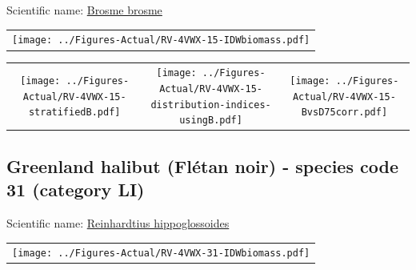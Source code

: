 \documentclass[12pt]{article}\usepackage[]{graphicx}\usepackage[]{color}
\begin{document}

Scientific name: \href{http://www.marinespecies.org/aphia.php?p=taxdetails\&id=126447}{Brosme brosme} \newline
\begin{minipage}{1.0\textwidth}
 \begin{tabular}{c}
\texttt{[image: ../Figures-Actual/RV-4VWX-15-IDWbiomass.pdf]} \\ 
\end{tabular} 
\end{minipage}
\newline

\vspace{1cm}
\begin{minipage}{1.0\textwidth}
 \begin{tabular}{ccc}
\texttt{[image: ../Figures-Actual/RV-4VWX-15-stratifiedB.pdf]} & 
\texttt{[image: ../Figures-Actual/RV-4VWX-15-distribution-indices-usingB.pdf]} & 
\texttt{[image: ../Figures-Actual/RV-4VWX-15-BvsD75corr.pdf]} \\ 
\end{tabular} 
\end{minipage}
\clearpage

\renewcommand\thefigure{\thesubsection\Alph{figure}}

\setcounter{figure}{0}

\hypertarget{sec:31}{%
\subsection{Greenland halibut (Flétan noir) - species code 31 (category LI)}\label{sec:31}}

  


Scientific name: \href{http://www.marinespecies.org/aphia.php?p=taxdetails\&id=127144}{Reinhardtius hippoglossoides} \newline
\begin{minipage}{1.0\textwidth}
 \begin{tabular}{c}
\texttt{[image: ../Figures-Actual/RV-4VWX-31-IDWbiomass.pdf]} \\ 
\end{tabular} 
\end{minipage}
\newline
\end{document}
